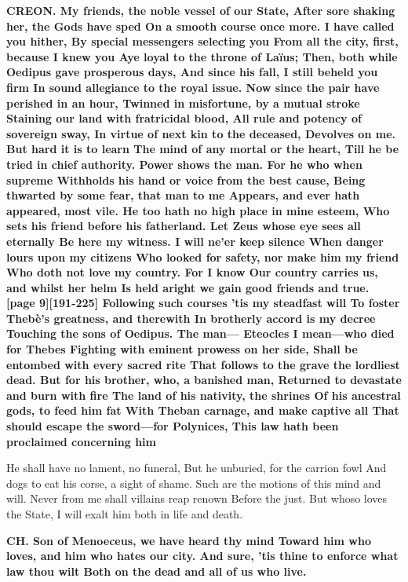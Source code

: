 \documentclass[11pt,letter]{book}
\begin{document}
\par \textbf{CREON. My friends, the noble vessel of our State, After sore shaking her, the Gods have sped On a smooth course once more. I have called you hither, By special messengers selecting you From all the city, first, because I knew you Aye loyal to the throne of Laïus; Then, both while Oedipus gave prosperous days, And since his fall, I still beheld you firm In sound allegiance to the royal issue. Now since the pair have perished in an hour, Twinned in misfortune, by a mutual stroke Staining our land with fratricidal blood, All rule and potency of sovereign sway, In virtue of next kin to the deceased, Devolves on me. But hard it is to learn The mind of any mortal or the heart, Till he be tried in chief authority. Power shows the man. For he who when supreme Withholds his hand or voice from the best cause, Being thwarted by some fear, that man to me Appears, and ever hath appeared, most vile. He too hath no high place in mine esteem, Who sets his friend before his fatherland. Let Zeus whose eye sees all eternally Be here my witness. I will ne’er keep silence When danger lours upon my citizens Who looked for safety, nor make him my friend Who doth not love my country. For I know Our country carries us, and whilst her helm Is held aright we gain good friends and true. [page 9][191-225] Following such courses ’tis my steadfast will To foster Thebè’s greatness, and therewith In brotherly accord is my decree Touching the sons of Oedipus. The man— Eteocles I mean—who died for Thebes Fighting with eminent prowess on her side, Shall be entombed with every sacred rite That follows to the grave the lordliest dead. But for his brother, who, a banished man, Returned to devastate and burn with fire The land of his nativity, the shrines Of his ancestral gods, to feed him fat With Theban carnage, and make captive all That should escape the sword—for Polynices, This law hath been proclaimed concerning him}
\par   He shall have no lament, no funeral, But he unburied, for the carrion fowl And dogs to eat his corse, a sight of shame. Such are the motions of this mind and will. Never from me shall villains reap renown Before the just. But whoso loves the State, I will exalt him both in life and death.

\par \textbf{CH. Son of Menoeceus, we have heard thy mind Toward him who loves, and him who hates our city. And sure, ’tis thine to enforce what law thou wilt Both on the dead and all of us who live.}
\par 
\end{document}
